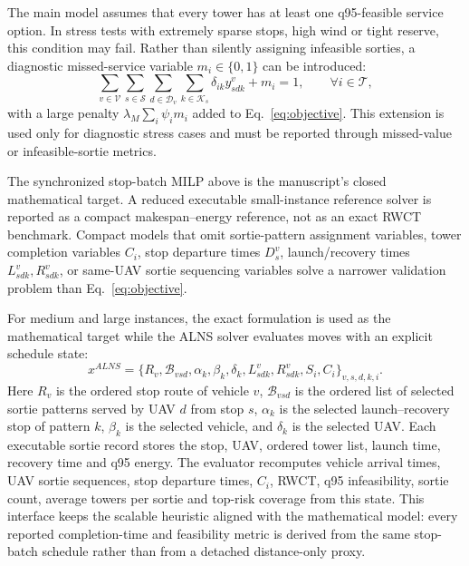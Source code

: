 The main model assumes that every tower has at least one q95-feasible service option. In stress tests with extremely sparse stops, high wind or tight reserve, this condition may fail. Rather than silently assigning infeasible sorties, a diagnostic missed-service variable \(m_i\in\{0,1\}\) can be introduced:
\begin{equation}
\sum_{v\in\mathcal{V}}\sum_{s\in\mathcal{S}}\sum_{d\in\mathcal{D}_v}
\sum_{k\in\mathcal{K}_s}\delta_{ik}y^v_{sdk}+m_i=1,
\qquad \forall i\in\mathcal{T},
\label{eq:sb-slack-coverage}
\end{equation}
with a large penalty \(\lambda_M\sum_i\psi_i m_i\) added to Eq.~\eqref{eq:objective}. This extension is used only for diagnostic stress cases and must be reported through missed-value or infeasible-sortie metrics.

The synchronized stop-batch MILP above is the manuscript's closed mathematical target. A reduced executable small-instance reference solver is reported as a compact makespan--energy reference, not as an exact RWCT benchmark. Compact models that omit sortie-pattern assignment variables, tower completion variables \(C_i\), stop departure times \(D^v_s\), launch/recovery times \(L^v_{sdk},R^v_{sdk}\), or same-UAV sortie sequencing variables solve a narrower validation problem than Eq.~\eqref{eq:objective}.

For medium and large instances, the exact formulation is used as the mathematical target while the ALNS solver evaluates moves with an explicit schedule state:
\begin{equation}
x^{ALNS}=
\{R_v,\mathcal{B}_{vsd},\alpha_k,\beta_k,\delta_k,
L^v_{sdk},R^v_{sdk},S_i,C_i\}_{v,s,d,k,i}.
\label{eq:sb-alns-state}
\end{equation}
Here \(R_v\) is the ordered stop route of vehicle \(v\), \(\mathcal{B}_{vsd}\) is the ordered list of selected sortie patterns served by UAV \(d\) from stop \(s\), \(\alpha_k\) is the selected launch--recovery stop of pattern \(k\), \(\beta_k\) is the selected vehicle, and \(\delta_k\) is the selected UAV. Each executable sortie record stores the stop, UAV, ordered tower list, launch time, recovery time and q95 energy. The evaluator recomputes vehicle arrival times, UAV sortie sequences, stop departure times, \(C_i\), RWCT, q95 infeasibility, sortie count, average towers per sortie and top-risk coverage from this state. This interface keeps the scalable heuristic aligned with the mathematical model: every reported completion-time and feasibility metric is derived from the same stop-batch schedule rather than from a detached distance-only proxy.
